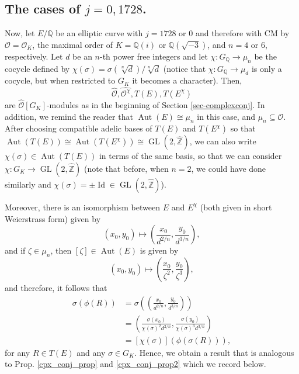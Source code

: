 \documentclass[11pt]{amsart}
\theoremstyle{definition}
\newcommand{\Q}{\mathbb{Q}}
\newcommand{\Z}{\mathbb{Z}}
\newcommand{\OK}{\mathcal{O}_K}
\newcommand{\Aut}{\operatorname{Aut}}
\newcommand{\GL}{\operatorname{GL}}
\begin{document}
\subsection{The cases of \texorpdfstring{$j=0,1728$}{j=0,1728}.}

Now, let $E/\Q$ be an elliptic curve with $j=1728$ or $0$ and therefore with CM by $\mathcal{O}=\OK$, the maximal order of $K=\Q(i)$ or $\Q(\sqrt{-3})$, and $n=4$ or $6$, respectively. Let $d$ be an $n$-th power free integers and let $\chi\colon G_\Q\to \mu_n$ be the cocycle defined by $\chi(\sigma)=\sigma(\sqrt[n]{d})/\sqrt[n]{d}$ (notice that $\chi\colon G_\Q \to \mu_d$ is only a cocycle, but when restricted to $G_K$ it becomes a character). Then, 
$$\widehat{\mathcal{O}},\widehat{\mathcal{O}^\chi}, T(E), T(E^\chi)$$
are $\widehat{\mathcal{O}}[G_K]$-modules as in the beginning of Section \ref{sec-complexconj}. In addition, we remind the reader that $\Aut(E)\cong \mu_n$ in this case, and $\mu_n\subseteq \mathcal{O}$. After choosing compatible adelic bases of $T(E)$ and $T(E^\chi)$ so that $\Aut(T(E))\cong \Aut(T(E^\chi))\cong \GL(2,\widehat{\Z})$, we can also write $\chi(\sigma)\in \Aut(T(E))$ in terms of the same basis, so that we can consider $\chi\colon G_K \to \GL(2,\widehat{\Z})$ (note that before, when $n=2$, we could have done similarly and $\chi(\sigma) = \pm \operatorname{Id}\in \GL(2,\widehat{\Z})$). 

Moreover, there is an isomorphism between $E$ and $E^\chi$ (both given in short Weierstrass form) given by 
$$(x_0,y_0) \mapsto \left(\frac{x_0}{d^{2/n}},\frac{y_0}{d^{3/n}}\right),$$
and if $\zeta\in \mu_n$, then $[\zeta]\in \Aut(E)$ is given by
$$(x_0,y_0) \mapsto \left(\frac{x_0}{\zeta^{2}},\frac{y_0}{\zeta^{3}}\right),$$
and therefore, it follows that 
\begin{align*}
    \sigma(\phi(R)) &=\sigma\left(\left(\frac{x_0}{d^{2/n}},\frac{y_0}{d^{3/n}}\right)\right)\\
    &= \left(\frac{\sigma(x_0)}{\chi(\sigma)^2d^{2/n}},\frac{\sigma(y_0)}{\chi(\sigma)^3d^{3/n}}\right)\\
    &=[\chi(\sigma)](\phi(\sigma(R))),
\end{align*}
for any $R\in T(E)$ and any $\sigma\in G_K$. Hence, we obtain a result that is analogous to Prop. \ref{cpx_conj_prop} and \ref{cpx_conj_prop2} which we record below.
\end{document}
